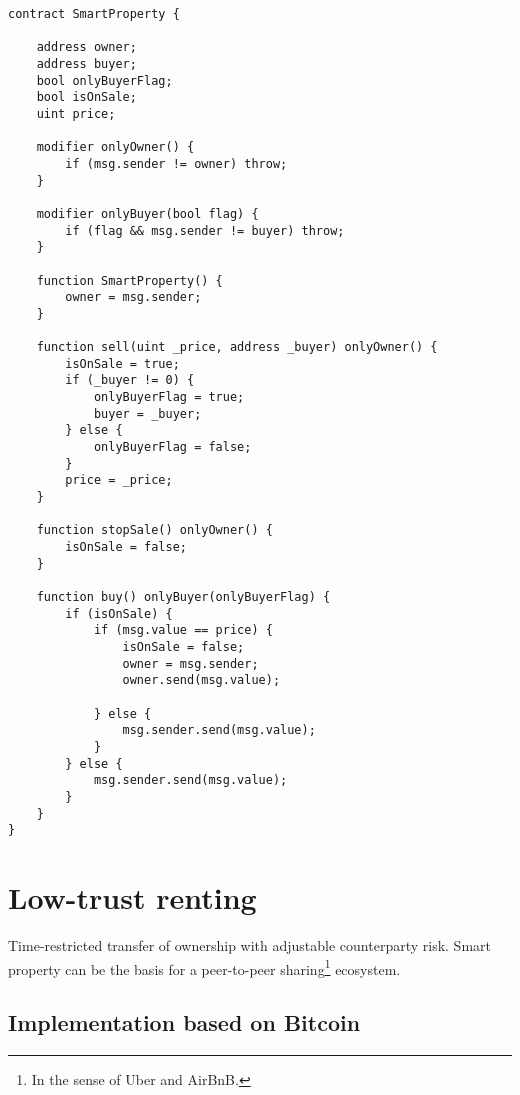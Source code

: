 \newpage
\begin{lstlisting}[breaklines,basicstyle=\tiny]
contract SmartProperty {
    
    address owner;
    address buyer;
    bool onlyBuyerFlag;
    bool isOnSale;
    uint price;
    
    modifier onlyOwner() {
        if (msg.sender != owner) throw;
    }
    
    modifier onlyBuyer(bool flag) {
        if (flag && msg.sender != buyer) throw;
    }
    
    function SmartProperty() {
        owner = msg.sender;
    }
    
    function sell(uint _price, address _buyer) onlyOwner() {
        isOnSale = true;
        if (_buyer != 0) {
            onlyBuyerFlag = true;
            buyer = _buyer;
        } else {
            onlyBuyerFlag = false;
        }
        price = _price;
    }
    
    function stopSale() onlyOwner() {
        isOnSale = false;
    }
        
    function buy() onlyBuyer(onlyBuyerFlag) {
        if (isOnSale) {
            if (msg.value == price) {
                isOnSale = false;
                owner = msg.sender;
                owner.send(msg.value);
                
            } else {
                msg.sender.send(msg.value);
            }
        } else {
            msg.sender.send(msg.value);
        }
    }
}
\end{lstlisting}


\section{Low-trust renting}

Time-restricted transfer of ownership with adjustable counterparty risk. Smart property can be the basis for a peer-to-peer sharing\footnote{In the sense of Uber and AirBnB.} ecosystem. 

\subsection{Implementation based on Bitcoin}

